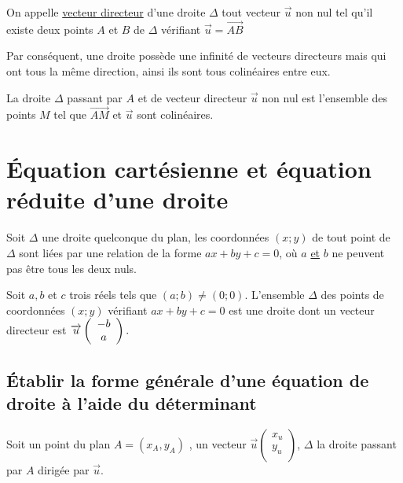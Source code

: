 \documentclass[french]{book}
\begin{document}
\begin{defn}
On appelle \underline{vecteur directeur} d'une droite $\Delta$ tout vecteur $\overrightarrow{u}$ non nul tel qu'il existe deux points $A$ et $B$ de $\Delta$ vérifiant $\overrightarrow{u}=\overrightarrow{AB}$  
\end{defn}

Par conséquent, une droite possède une infinité de vecteurs directeurs mais qui ont tous la même direction, ainsi ils sont tous colinéaires entre eux.

\begin{prop}
La droite $\Delta$ passant par $A$ et de vecteur directeur $\overrightarrow{u}$ non nul est l'ensemble des points $M$ tel que $\overrightarrow{AM}$ et  $\overrightarrow{u}$ sont colinéaires.
\end{prop}

\section{Équation cartésienne et équation réduite d'une droite}

\begin{prop}
Soit $\Delta$ une droite quelconque du plan, les coordonnées $(x;y)$ de tout point de $\Delta$ sont liées par une relation de la forme $ax+by+c=0$, où $a$ \underline{et} $b$ ne peuvent pas être tous les deux nuls. 
\end{prop}

\begin{prop}
Soit $a,b$ et $c$ trois réels tels que $(a;b)\neq (0;0)$. L'ensemble $\Delta$ des points de coordonnées $(x;y)$ vérifiant $ax+by+c=0$ est une droite dont un vecteur directeur est $\overrightarrow{u} \left( \begin{array}{c}
-b \\
a \\
\end{array} \right). \\ 
$
\end{prop}

\newpage

\subsection{Établir la forme générale d'une équation de droite à l'aide du déterminant}
 
Soit un point du plan $A=(x_A,y_A)$ , un vecteur $\overrightarrow{u}\left( \begin{array}{c}
x_u\\
y_u \\
\end{array} \right) $, $\Delta$ la droite passant par $A$ dirigée par $\overrightarrow{u}$. 
\end{document}
